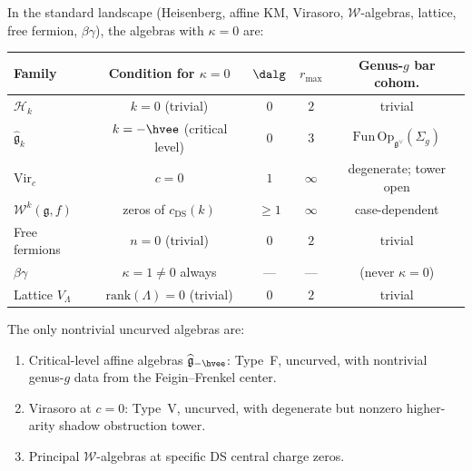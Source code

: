 \documentclass[11pt]{article}
\newcommand{\cW}{\mathcal{W}}
\newcommand{\cH}{\mathcal{H}}
\newcommand{\fg}{\mathfrak{g}}
\begin{document}
\begin{proposition}
\label{prop:uncurved-locus-complete}
In the standard landscape (Heisenberg, affine KM, Virasoro,
$\cW$-algebras, lattice, free fermion, $\beta\gamma$), the
algebras with $\kappa = 0$ are:
\begin{center}
\renewcommand{\arraystretch}{1.3}
\begin{tabular}{lcccc}
\textbf{Family} & \textbf{Condition for $\kappa = 0$}
  & $\boldsymbol{\dalg}$ & \textbf{$r_{\max}$}
  & \textbf{Genus-$g$ bar cohom.} \\
\hline
$\cH_k$ & $k = 0$ (trivial) & $0$ & $2$
  & trivial \\
$\widehat{\fg}_k$ & $k = -\hvee$ (critical level)
  & $0$ & $3$
  & $\mathrm{Fun}\,\mathrm{Op}_{\fg^\vee}(\Sigma_g)$ \\
$\mathrm{Vir}_c$ & $c = 0$ & $1$ & $\infty$
  & degenerate; tower open \\
$\cW^k(\fg, f)$ & zeros of $c_{\mathrm{DS}}(k)$
  & $\geq 1$ & $\infty$
  & case-dependent \\
Free fermions & $n = 0$ (trivial) & $0$ & $2$
  & trivial \\
$\beta\gamma$ & $\kappa = 1 \neq 0$ always & --- & ---
  & (never $\kappa = 0$) \\
Lattice $V_\Lambda$ & $\mathrm{rank}(\Lambda) = 0$ (trivial)
  & $0$ & $2$
  & trivial
\end{tabular}
\end{center}
The only nontrivial uncurved algebras are:
\begin{enumerate}[label=\textup{(\roman*)}]
\item Critical-level affine algebras
  $\widehat{\fg}_{-\hvee}$: Type~F, uncurved, with
  nontrivial genus-$g$ data from the Feigin--Frenkel center.
\item Virasoro at $c = 0$: Type~V, uncurved, with degenerate
  but nonzero higher-arity shadow obstruction tower.
\item Principal $\cW$-algebras at specific DS central charge zeros.
\end{enumerate}
\end{proposition}
\end{document}
